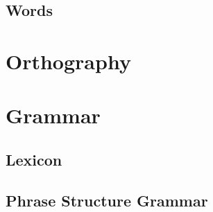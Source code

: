 \documentclass{report}
\begin{document}
	\section{Words}
	
	\chapter{Orthography}
	
	\chapter{Grammar}
	
	\section{Lexicon}
	
	\section{Phrase Structure Grammar}
   
   \printbibliography
\end{document}

